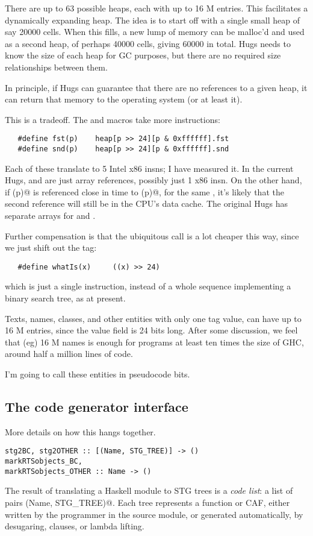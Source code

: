 There are up to 63 possible heaps, each with up to 16 M entries.
This facilitates a dynamically expanding heap.  The idea is to start
off with a single small heap of say 20000 cells.  When this fills,
a new lump of memory can be malloc'd and used as a second heap, of
perhaps 40000 cells, giving 60000 in total.  Hugs needs to know the
size of each heap for GC purposes, but there are no required size
relationships between them.  

In principle, if Hugs can guarantee that there are no references
to a given heap, it can return that memory to the operating system
(or at least \verb@free@ it).

This is a tradeoff.  The \verb@fst@ and \verb@snd@ macros 
take more instructions:
\begin{verbatim}
   #define fst(p)    heap[p >> 24][p & 0xffffff].fst
   #define snd(p)    heap[p >> 24][p & 0xffffff].snd
\end{verbatim}
Each of these translate to 5 Intel x86 insns; I have measured it.
In the current Hugs, \verb@fst@ and \verb@snd@ are just array
references, possibly just 1 x86 insn.
On the other hand, if \verb@fst(p)@ is referenced close in time
to \verb@snd(p)@, for the same \verb@p@, it's likely that the
second reference will still be in the CPU's data cache.  The original
Hugs has separate arrays for \verb@fst@ and \verb@snd@.

Further compensation is that the ubiquitous \verb@whatIs@ call
is a lot cheaper this way, since we just shift out the tag:
\begin{verbatim}
   #define whatIs(x)     ((x) >> 24)
\end{verbatim}
which is just a single instruction, instead of a whole sequence 
implementing a binary search tree, as at present.

Texts, names, classes, and other entities with only one tag value,
can have up to 16 M entries, since the value field is 24 bits long.
After some discussion, we feel that (eg) 16 M names is enough for
programs at least ten times the size of GHC, around half a million
lines of code.

I'm going to call these entities \verb@HugsPtr@ in pseudocode bits.

\subsection{The code generator interface}
More details on how this hangs together.
\begin{verbatim}
stg2BC, stg2OTHER :: [(Name, STG_TREE)] -> ()
markRTSobjects_BC,
markRTSobjects_OTHER :: Name -> ()
\end{verbatim}
The result of translating a Haskell module to STG trees is a
{\em code list}: a list of pairs \verb@(Name, STG_TREE)@.
Each tree represents a function or CAF, either written by 
the programmer in the source module, or generated automatically,
by desugaring, \verb@deriving@ clauses, or lambda lifting.

